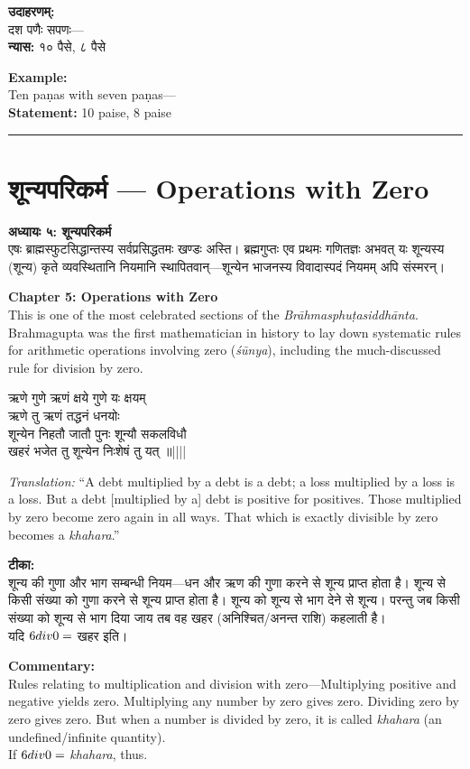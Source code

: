 \documentclass[10pt,a4paper]{article}
\newcommand{\dev}[1]{{\devanagarifont #1}}
\newcommand{\longline}{\noindent\rule{\textwidth}{0.4pt}}
\newcommand{\vnum}[1]{\hfill\textnormal{||#1||}}
\newenvironment{shloka}{%
  \begin{lrbox}{\shlokabox}
  \begin{minipage}{\dimexpr\textwidth-16pt\relax}%
  \devanagarifont\centering\setstretch{1.3}%
}{%
  \end{minipage}%
  \end{lrbox}%
  \par\medskip\noindent\fcolorbox{rulecolor}{versebg}{\usebox{\shlokabox}}\par\medskip
}
\newcommand{\bilingual}[2]{%
  \noindent%
  \begin{minipage}[t]{0.47\textwidth}%
    \setstretch{1.15}#1%
  \end{minipage}%
  \hfill%
  \vrule\hfill%
  \begin{minipage}[t]{0.47\textwidth}%
    \setstretch{1.15}#2%
  \end{minipage}%
  \par\medskip
}
\begin{document}
\bilingual{%
\textbf{उदाहरणम्:}\\[0.3em]
दश पणैः सपणः---\\[0.3em]
\textbf{न्यास:} १० पैसे, ८ पैसे
}{%
\textbf{Example:}\\[0.3em]
Ten paṇas with seven paṇas---\\[0.3em]
\textbf{Statement:} 10 paise, 8 paise
}

\vspace{0.5em}
\noindent\longline
\vspace{0.5em}

\section{\dev{शून्यपरिकर्म} --- Operations with Zero}

\bilingual{%
\textbf{अध्यायः ५: शून्यपरिकर्म}\\[0.3em]
एषः ब्राह्मस्फुटसिद्धान्तस्य सर्वप्रसिद्धतमः खण्डः अस्ति। ब्रह्मगुप्तः एव प्रथमः गणितज्ञः अभवत् यः शून्यस्य (\dev{शून्य}) कृते व्यवस्थितानि नियमानि स्थापितवान्---शून्येन भाजनस्य विवादास्पदं नियमम् अपि संस्मरन्।
}{%
\textbf{Chapter 5: Operations with Zero}\\[0.3em]
This is one of the most celebrated sections of the \textit{Brāhmasphuṭasiddhānta}. Brahmagupta was the first mathematician in history to lay down systematic rules for arithmetic operations involving zero (\textit{śūnya}), including the much-discussed rule for division by zero.
}

\bilingual{%
\begin{shloka}
ऋणे गुणे ऋणं क्षये गुणे यः क्षयम्\\
ऋणे तु ऋणं तद्धनं धनयोः\\
शून्येन निहतौ जातौ पुनः शून्यौ सकलविधौ\\
खहरं भजेत तु शून्येन निःशेषं तु यत् ॥\vnum{}
\end{shloka}
}{%
\textit{Translation:} ``A debt multiplied by a debt is a debt; a loss multiplied by a loss is a loss. But a debt [multiplied by a] debt is positive for positives. Those multiplied by zero become zero again in all ways. That which is exactly divisible by zero becomes a \textit{khahara}.''
}

\bilingual{%
\textbf{टीका:}\\[0.3em]
शून्य की गुणा और भाग सम्बन्धी नियम---धन और ऋण की गुणा करने से शून्य प्राप्त होता है। शून्य से किसी संख्या को गुणा करने से शून्य प्राप्त होता है। शून्य को शून्य से भाग देने से शून्य। परन्तु जब किसी संख्या को शून्य से भाग दिया जाय तब वह \dev{खहर} (अनिश्चित/अनन्त राशि) कहलाती है।\\[0.3em]
यदि $6 \\div 0 = $ खहर इति।
}{%
\textbf{Commentary:}\\[0.3em]
Rules relating to multiplication and division with zero---Multiplying positive and negative yields zero. Multiplying any number by zero gives zero. Dividing zero by zero gives zero. But when a number is divided by zero, it is called \textit{khahara} (an undefined/infinite quantity).\\[0.3em]
If $6 \\div 0 = $ \textit{khahara}, thus.
}
\end{document}
